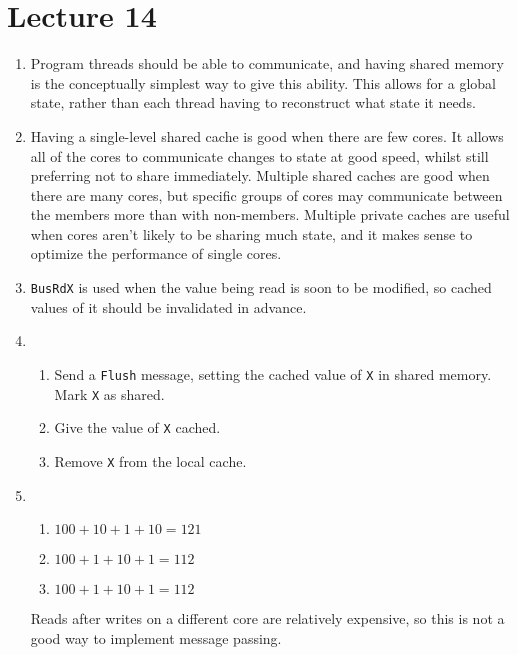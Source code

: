\documentclass{article}
\begin{document}
\section{Lecture 14}
\begin{enumerate}
  \item Program threads should be able to communicate, and having shared memory is the conceptually simplest way to give this ability. This allows for a global state, rather than each thread having to reconstruct what state it needs.
  \item Having a single-level shared cache is good when there are few cores. It allows all of the cores to communicate changes to state at good speed, whilst still preferring not to share immediately. Multiple shared caches are good when there are many cores, but specific groups of cores may communicate between the members more than with non-members. Multiple private caches are useful when cores aren't likely to be sharing much state, and it makes sense to optimize the performance of single cores.
  \item \texttt{BusRdX} is used when the value being read is soon to be modified, so cached values of it should be invalidated in advance.
  \item
    \begin{enumerate}
      \item Send a \texttt{Flush} message, setting the cached value of \texttt{X} in shared memory. Mark \texttt{X} as shared.
      \item Give the value of \texttt{X} cached.
      \item Remove \texttt{X} from the local cache.
    \end{enumerate}
  \item
    \begin{enumerate}
      \item $100 + 10 + 1 + 10 = 121$
      \item $100 + 1 + 10 + 1 = 112$
      \item $100 + 1 + 10 + 1 = 112$
    \end{enumerate}
    Reads after writes on a different core are relatively expensive, so this is not a good way to implement message passing.
\end{enumerate}
\end{document}
